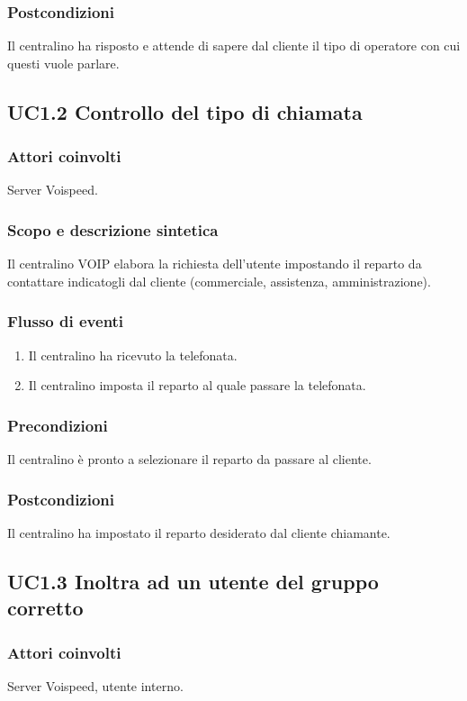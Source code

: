 \subsubsection*{Postcondizioni} Il centralino ha risposto e attende di sapere dal cliente il tipo di operatore con cui questi vuole parlare.

\subsection*{UC1.2 Controllo del tipo di chiamata}
\subsubsection*{Attori coinvolti} Server Voispeed.
\subsubsection*{Scopo e descrizione sintetica}
Il centralino VOIP elabora la richiesta dell'utente impostando il reparto da contattare indicatogli dal cliente (commerciale, assistenza, amministrazione).
\subsubsection*{Flusso di eventi}
\begin{enumerate}
\item Il centralino ha ricevuto la telefonata.
\item Il centralino imposta il reparto al quale passare la telefonata.
\end{enumerate}
\subsubsection*{Precondizioni} Il centralino \` e pronto a selezionare il reparto da passare al cliente.
\subsubsection*{Postcondizioni} Il centralino ha impostato il reparto desiderato dal cliente chiamante.

\subsection*{UC1.3 Inoltra ad un utente del gruppo corretto}
\subsubsection*{Attori coinvolti} Server Voispeed, utente interno.

